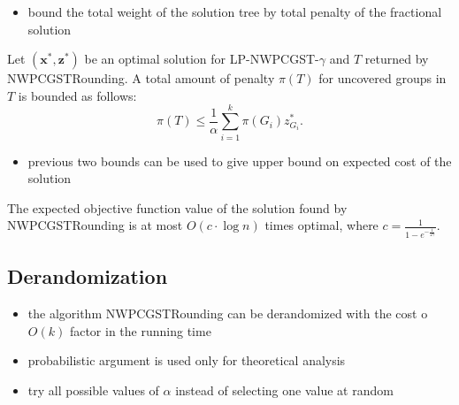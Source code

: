 \documentclass{beamer}
\begin{document}
\begin{frame}{\insertsection}{\insertsubsection}
    \begin{itemize}
        \item bound the total weight of the solution tree by total \alert{penalty} of the fractional solution
    \end{itemize}
    \begin{lemma}
        Let $(\mathbf{x}^\ast,\mathbf{z}^\ast)$ be an optimal solution for LP-NWPCGST-$\gamma$ and $T$ returned by \textrm{NWPCGSTRounding}. A total amount of penalty $\pi\left(T\right)$ for uncovered groups in $T$ is bounded as follows:
$$\pi\left(T\right)\leq\frac{1}{\alpha}\sum_{i=1}^{k}{\pi\left(G_i\right)z_{G_i}^\ast}.$$

    \end{lemma}

\end{frame}


\begin{frame}{\insertsection}{\insertsubsection}
    \begin{itemize}
        \item previous two bounds can be used to give upper bound on expected cost of the solution
    \end{itemize}
    \begin{theorem}
        The expected objective function value of the solution found by \textrm{NWPCGSTRounding} is at most $O(c\cdot\log{n})$ times optimal, where $c=\frac{1}{1-e^{-\frac{1}{2\gamma}}}$.

    \end{theorem}

\end{frame}

\subsection*{Derandomization}
\begin{frame}{\insertsection}{\insertsubsection}
    \begin{itemize}
        \item the algorithm \textrm{NWPCGSTRounding} can be derandomized with the cost o $O(k)$ factor in the running time
        \item probabilistic argument is used only for theoretical analysis
        \item try all possible values of $\alpha$ instead of selecting one value at random
    \end{itemize}
   

\end{frame}
\end{document}
